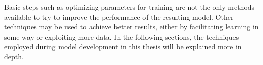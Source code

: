 Basic steps such as optimizing parameters for training are not the only methods available to try to improve the performance of the resulting model. 
Other techniques may be used to achieve better results, either by facilitating learning in some way or exploiting more data. 
In the following sections, the techniques employed during model development in this thesis will be explained more in depth.